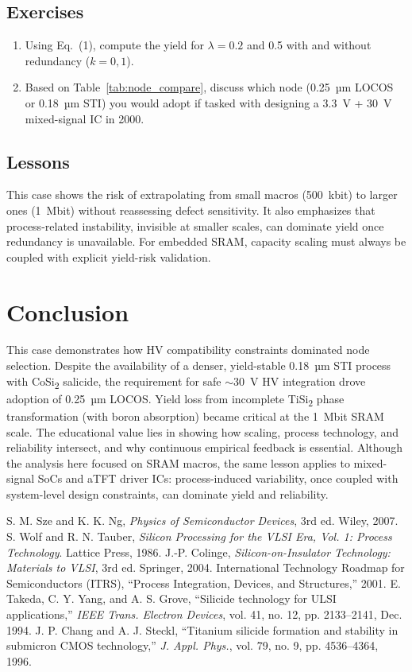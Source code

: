 \documentclass[conference]{IEEEtran}
\begin{document}
\subsection{Exercises}
\begin{enumerate}
  \item Using Eq.~(1), compute the yield for $\lambda=0.2$ and 0.5 with and without redundancy ($k=0,1$).
  \item Based on Table~\ref{tab:node_compare}, discuss which node (0.25~µm LOCOS or 0.18~µm STI) you would adopt if tasked with designing a 3.3~V + 30~V mixed-signal IC in 2000.
\end{enumerate}

\subsection{Lessons}
This case shows the risk of extrapolating from small macros (500~kbit) to larger ones (1~Mbit) without reassessing defect sensitivity.
It also emphasizes that process-related instability, invisible at smaller scales, can dominate yield once redundancy is unavailable.
For embedded SRAM, capacity scaling must always be coupled with explicit yield-risk validation.

\section{Conclusion}
This case demonstrates how HV compatibility constraints dominated node selection.
Despite the availability of a denser, yield-stable 0.18~µm STI process with CoSi\textsubscript{2} salicide, the requirement for safe $\sim$30~V HV integration drove adoption of 0.25~µm LOCOS.
Yield loss from incomplete TiSi\textsubscript{2} phase transformation (with boron absorption) became critical at the 1~Mbit SRAM scale.
The educational value lies in showing how scaling, process technology, and reliability intersect, and why continuous empirical feedback is essential.
Although the analysis here focused on SRAM macros, the same lesson applies to mixed-signal SoCs and aTFT driver ICs: process-induced variability, once coupled with system-level design constraints, can dominate yield and reliability.

\begin{thebibliography}{99}
 S. M. Sze and K. K. Ng, \textit{Physics of Semiconductor Devices}, 3rd ed. Wiley, 2007.
 S. Wolf and R. N. Tauber, \textit{Silicon Processing for the VLSI Era, Vol. 1: Process Technology}. Lattice Press, 1986.
 J.-P. Colinge, \textit{Silicon-on-Insulator Technology: Materials to VLSI}, 3rd ed. Springer, 2004.
 International Technology Roadmap for Semiconductors (ITRS), ``Process Integration, Devices, and Structures,'' 2001.
 E. Takeda, C. Y. Yang, and A. S. Grove, ``Silicide technology for ULSI applications,'' \textit{IEEE Trans. Electron Devices}, vol. 41, no. 12, pp. 2133--2141, Dec. 1994.
 J. P. Chang and A. J. Steckl, ``Titanium silicide formation and stability in submicron CMOS technology,'' \textit{J. Appl. Phys.}, vol. 79, no. 9, pp. 4536--4364, 1996.
\end{thebibliography}
\end{document}

